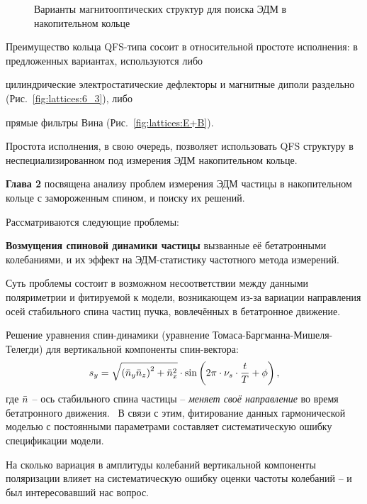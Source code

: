 \begin{figure}[H]
\begin{minipage}{.5\linewidth}{
	}
\end{minipage}%
\begin{minipage}{.5\linewidth}
\caption{Варианты магнитооптических структур для поиска ЭДМ в накопительном кольце}
\end{minipage}
\end{figure}

Преимущество кольца QFS-типа сосоит в относительной простоте исполнения: 
в предложенных вариантах, используются либо
\begin{enumerate*}
	\item цилиндрические электростатические дефлекторы и магнитные диполи раздельно
	 (Рис.~\ref{fig:lattices:6_3}), либо
	\item прямые фильтры Вина (Рис.~\ref{fig:lattices:E+B}).	
\end{enumerate*}
Простота исполнения, в свою очередь, позволяет использовать QFS структуру в неспециализированном под
измерения ЭДМ накопительном кольце.

\textbf{Глава 2} посвящена анализу проблем измерения ЭДМ частицы 
в накопительном кольце с замороженным спином, и поиску их решений. 

Рассматриваются следующие проблемы:

\textbf{Возмущения спиновой динамики частицы} вызванные её бетатронными колебаниями, и их эффект на ЭДМ-статистику частотного метода измерений.

Суть проблемы состоит в возможном несоответствии между данными поляриметрии и фитируемой к модели, 
возникающем из-за вариации направления осей стабильного спина частиц пучка, 
вовлечённых в бетатронное движение.

Решение уравнения спин-динамики (уравнение Томаса-Баргманна-Мишеля-Телегди)
для вертикальной компоненты спин-вектора:
\begin{equation}\label{eq:sy_analytic}
s_y = \sqrt{\bkt{\bar n_y\bar n_z}^2 + \bar n_x^2} \cdot \sin\bkt{2\pi\cdot\nu_s\cdot \frac{t}{T} + \phi},
\end{equation}
где $\bar n$ -- ось стабильного спина частицы -- \emph{меняет своё направление} во время бетатронного движения.~\cite[стр.~11]{Shatunov} В связи с этим, фитирование данных гармонической моделью с постоянными
параметрами составляет систематическую ошибку спецификации модели.

На сколько вариация в амплитуды колебаний вертикальной
компоненты поляризации влияет на систематическую ошибку оценки частоты колебаний -- 
и был интересовавший нас вопрос.

